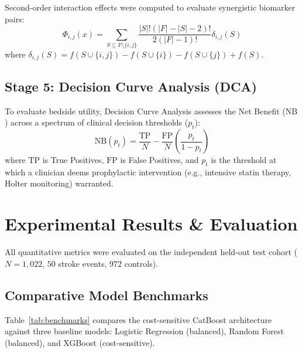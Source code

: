 \documentclass[conference]{IEEEtran}
\begin{document}
Second-order interaction effects were computed to evaluate synergistic biomarker pairs:
\begin{equation}
\Phi_{i, j}(x) = \sum_{S \subseteq F \setminus \{i, j\}} \frac{|S|!(|F| - |S| - 2)!}{2(|F| - 1)!} \delta_{i, j}(S)
\label{eq:shap_interaction}
\end{equation}
where $\delta_{i, j}(S) = f(S \cup \{i, j\}) - f(S \cup \{i\}) - f(S \cup \{j\}) + f(S)$.

\subsection{Stage 5: Decision Curve Analysis (DCA)}
To evaluate bedside utility, Decision Curve Analysis \cite{vickers2006decision} assesses the Net Benefit ($\text{NB}$) across a spectrum of clinical decision thresholds ($p_t$):
\begin{equation}
\text{NB}(p_t) = \frac{\text{TP}}{N} - \frac{\text{FP}}{N} \left( \frac{p_t}{1 - p_t} \right)
\label{eq:dca}
\end{equation}
where $\text{TP}$ is True Positives, $\text{FP}$ is False Positives, and $p_t$ is the threshold at which a clinician deems prophylactic intervention (e.g., intensive statin therapy, Holter monitoring) warranted.

\section{Experimental Results \& Evaluation}
All quantitative metrics were evaluated on the independent held-out test cohort ($N = 1,022$, $50$ stroke events, $972$ controls).

\subsection{Comparative Model Benchmarks}
Table~\ref{tab:benchmarks} compares the cost-sensitive CatBoost architecture against three baseline models: Logistic Regression (balanced), Random Forest (balanced), and XGBoost (cost-sensitive).
\end{document}
